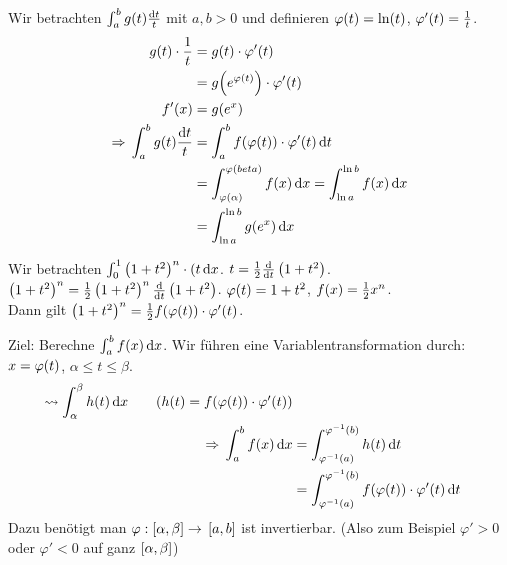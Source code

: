 \begin{beispiel}
    Wir betrachten $\int_{a}^{b} g\of{t} \frac{\dif t}{t}$ mit $a,b > 0$ und definieren $\varphi\of{t} = \ln\of{t}$, $\varphi'\of{t} = \frac{1}{t}$.
    \begin{align*}
        g\of{t}\cdot \frac{1}{t} &= g\of{t}\cdot\varphi'\of{t}\\
        &= g\of{e^{\varphi\of{t}}}\cdot\varphi'\of{t}\\
        f'\of{x} &= g\of{e^x}\\
        \impl \int_{a}^{b} g\of{t} \frac{\dif t}{t} &= \int_{a}^{b} f\of{\varphi\of{t}}\cdot\varphi'\of{t} \dif t\\
        &= \int_{\varphi\of{\alpha}}^{\varphi\of{beta}} f\of{x} \dif x = \int_{\ln a}^{\ln b} f\of{x} \dif x\\
        &= \int_{\ln a}^{\ln b} g\of{e^x} \dif x
    \end{align*}
\end{beispiel}

 \begin{beispiel}
     Wir betrachten $ \int_{0}^{1} \left(1+t^2\right)^{n}\cdot (t \mathop{}\!\mathrm{d} x$. $t = \frac{1}{2}\frac{\mathop{}\!\mathrm{d}}{\mathop{}\!\mathrm{d} t}\left(1+t^2\right)$. $\left(1+t^2\right)^n = \frac{1}{2}\left(1+t^2\right)^n \frac{\mathop{}\!\mathrm{d}}{\mathop{}\!\mathrm{d} t}\left(1+t^2\right)$. $\varphi\of{t} = 1+t^2$, $f\of{x} = \frac{1}{2}x^n$.\\
     Dann gilt $\pair{1+t^2}^n = \frac{1}{2}f\of{\varphi\of{t}}\cdot\varphi'\of{t}$.
 \end{beispiel}

\begin{genv}
    \marginnote{[10. Mai]}
    Ziel: Berechne $ \int_{a}^{b} f\of{x} \dif x$. Wir führen eine Variablentransformation durch: $x=\varphi\of{t}$, $\alpha \leq t \leq \beta$.
    \begin{align*}
        \leadsto \int_{\alpha}^{\beta} h\of{t} \dif x\tag{$h\of{t} = f\of{\varphi\of{t}}\cdot\varphi'\of{t}$}\\
        \impl \int_{a}^{b} f\of{x} \dif x &= \int_{\varphi^{-1}\of{a}}^{\varphi^{-1}\of{b}} h\of{t} \dif t\\
        &= \int_{\varphi^{-1}\of{a}}^{\varphi^{-1}\of{b}} f\of{\varphi\of{t}}\cdot\varphi'\of{t} \dif t
    \end{align*}
    Dazu benötigt man $\varphi: \left[\alpha, \beta\right]\rightarrow{}\left[a,b\right]$ ist invertierbar. (Also zum Beispiel $\varphi' > 0$ oder $\varphi' < 0$ auf ganz $\left[\alpha, \beta\right]$)
\end{genv}

